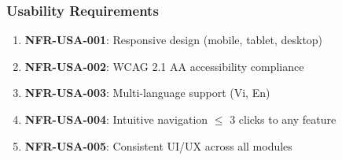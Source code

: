 \subsubsection{Usability Requirements}

\begin{enumerate}
    \item \textbf{NFR-USA-001}: Responsive design (mobile, tablet, desktop)
    \item \textbf{NFR-USA-002}: WCAG 2.1 AA accessibility compliance
    \item \textbf{NFR-USA-003}: Multi-language support (Vi, En)
    \item \textbf{NFR-USA-004}: Intuitive navigation $\leq$ 3 clicks to any feature
    \item \textbf{NFR-USA-005}: Consistent UI/UX across all modules
\end{enumerate}
